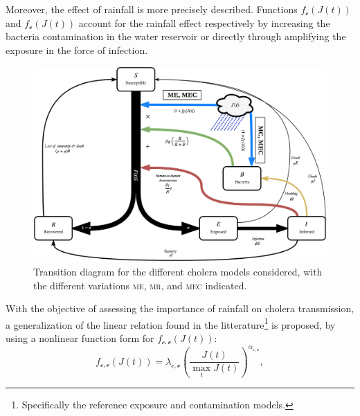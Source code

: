 Moreover, the effect of rainfall is more precisely described. Functions $f_{\mathcal{c}}\left(J(t)\right)$ and $f_{\mathcal{e}}\left(J(t)\right)$ account for the rainfall effect respectively by increasing the bacteria contamination in the water reservoir or directly through amplifying the exposure in the force of infection.
\begin{figure}
  \centering
  \includegraphics{fig_cholera-rainfall/Lemaitre_ACTROP_2018_42_R1_fig1.png}
  \caption[Transition diagram for the competing cholera models]{Transition diagram for the different cholera models considered, with the different variations \textsc{me}, \textsc{mr}, and \textsc{mec} indicated.}
  \label{diagram}
\end{figure}
With the objective of assessing the importance of rainfall on cholera transmission, a generalization of the linear relation found in the litterature\footnote{Specifically the reference exposure \parencite{Eisenberg:ExaminingRainfallCholera:2013} and contamination \parencite{Rinaldo:Reassessment20102011:2012} models.} is proposed, by using a nonlinear function form for  $f_{\mathcal{c,e}}\left(J(t)\right)$:
\begin{equation}
    f_{\mathcal{c,e}}\left(J(t)\right)=\lambda_{\mathcal{c,e}} \left(\frac{J(t)}{\max_t J(t)}\right)^{\alpha_{\mathcal{c,e}}},
    \label{eq:nonlinear_rain}
\end{equation}
